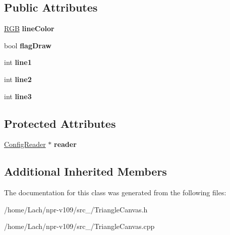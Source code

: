 \subsection*{Public Attributes}
\begin{DoxyCompactItemize}
\item 
\hypertarget{classTriangleCanvas_a60c02cd1db69f0c5b8e2d797e44f28a9}{}\label{classTriangleCanvas_a60c02cd1db69f0c5b8e2d797e44f28a9} 
\hyperlink{structRGB}{R\+GB} {\bfseries line\+Color}
\item 
\hypertarget{classTriangleCanvas_a9e15eef49aec3a11909c2adde510919d}{}\label{classTriangleCanvas_a9e15eef49aec3a11909c2adde510919d} 
bool {\bfseries flag\+Draw}
\item 
\hypertarget{classTriangleCanvas_adaab7c893c3b2d9c8e3669f4f3d65e74}{}\label{classTriangleCanvas_adaab7c893c3b2d9c8e3669f4f3d65e74} 
int {\bfseries line1}
\item 
\hypertarget{classTriangleCanvas_aa4c09dea9b5b0de4ecdde164b8bf826f}{}\label{classTriangleCanvas_aa4c09dea9b5b0de4ecdde164b8bf826f} 
int {\bfseries line2}
\item 
\hypertarget{classTriangleCanvas_a03c31b56159dd46656649bf3d87031e1}{}\label{classTriangleCanvas_a03c31b56159dd46656649bf3d87031e1} 
int {\bfseries line3}
\end{DoxyCompactItemize}
\subsection*{Protected Attributes}
\begin{DoxyCompactItemize}
\item 
\hypertarget{classTriangleCanvas_ac98c063d58322ba5b00e13b4911d1a9c}{}\label{classTriangleCanvas_ac98c063d58322ba5b00e13b4911d1a9c} 
\hyperlink{classConfigReader}{Config\+Reader} $\ast$ {\bfseries reader}
\end{DoxyCompactItemize}
\subsection*{Additional Inherited Members}


The documentation for this class was generated from the following files\+:\begin{DoxyCompactItemize}
\item 
/home/\+Lach/npr-\/v109/src\+\_/Triangle\+Canvas.\+h\item 
/home/\+Lach/npr-\/v109/src\+\_/Triangle\+Canvas.\+cpp\end{DoxyCompactItemize}

